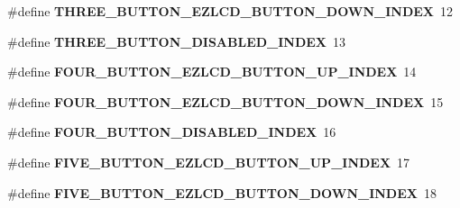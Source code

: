 \begin{DoxyCompactItemize}
\item 
\hypertarget{group__ez_l_c_d__103__user__config_gab9e005206888630622434b0f7b35d164}{\#define {\bfseries T\-H\-R\-E\-E\-\_\-\-B\-U\-T\-T\-O\-N\-\_\-\-E\-Z\-L\-C\-D\-\_\-\-B\-U\-T\-T\-O\-N\-\_\-\-D\-O\-W\-N\-\_\-\-I\-N\-D\-E\-X}~12}\label{group__ez_l_c_d__103__user__config_gab9e005206888630622434b0f7b35d164}

\item 
\hypertarget{group__ez_l_c_d__103__user__config_gac9e42e1fa8b79545e44c5e6c4cc8b508}{\#define {\bfseries T\-H\-R\-E\-E\-\_\-\-B\-U\-T\-T\-O\-N\-\_\-\-D\-I\-S\-A\-B\-L\-E\-D\-\_\-\-I\-N\-D\-E\-X}~13}\label{group__ez_l_c_d__103__user__config_gac9e42e1fa8b79545e44c5e6c4cc8b508}

\item 
\hypertarget{group__ez_l_c_d__103__user__config_gaea573a773da16ce6ad49f9241b577941}{\#define {\bfseries F\-O\-U\-R\-\_\-\-B\-U\-T\-T\-O\-N\-\_\-\-E\-Z\-L\-C\-D\-\_\-\-B\-U\-T\-T\-O\-N\-\_\-\-U\-P\-\_\-\-I\-N\-D\-E\-X}~14}\label{group__ez_l_c_d__103__user__config_gaea573a773da16ce6ad49f9241b577941}

\item 
\hypertarget{group__ez_l_c_d__103__user__config_ga8d2b6593ba0ec32ea2c1754550c21a7c}{\#define {\bfseries F\-O\-U\-R\-\_\-\-B\-U\-T\-T\-O\-N\-\_\-\-E\-Z\-L\-C\-D\-\_\-\-B\-U\-T\-T\-O\-N\-\_\-\-D\-O\-W\-N\-\_\-\-I\-N\-D\-E\-X}~15}\label{group__ez_l_c_d__103__user__config_ga8d2b6593ba0ec32ea2c1754550c21a7c}

\item 
\hypertarget{group__ez_l_c_d__103__user__config_ga6dbb47dd98825ed4e20dc06efbb14ea6}{\#define {\bfseries F\-O\-U\-R\-\_\-\-B\-U\-T\-T\-O\-N\-\_\-\-D\-I\-S\-A\-B\-L\-E\-D\-\_\-\-I\-N\-D\-E\-X}~16}\label{group__ez_l_c_d__103__user__config_ga6dbb47dd98825ed4e20dc06efbb14ea6}

\item 
\hypertarget{group__ez_l_c_d__103__user__config_ga64f3f670934fb6078a54e9b4b1e81d5e}{\#define {\bfseries F\-I\-V\-E\-\_\-\-B\-U\-T\-T\-O\-N\-\_\-\-E\-Z\-L\-C\-D\-\_\-\-B\-U\-T\-T\-O\-N\-\_\-\-U\-P\-\_\-\-I\-N\-D\-E\-X}~17}\label{group__ez_l_c_d__103__user__config_ga64f3f670934fb6078a54e9b4b1e81d5e}

\item 
\hypertarget{group__ez_l_c_d__103__user__config_ga127100c5ebc8a69079a780f7561ed8a8}{\#define {\bfseries F\-I\-V\-E\-\_\-\-B\-U\-T\-T\-O\-N\-\_\-\-E\-Z\-L\-C\-D\-\_\-\-B\-U\-T\-T\-O\-N\-\_\-\-D\-O\-W\-N\-\_\-\-I\-N\-D\-E\-X}~18}\label{group__ez_l_c_d__103__user__config_ga127100c5ebc8a69079a780f7561ed8a8}


\end{DoxyCompactItemize}
